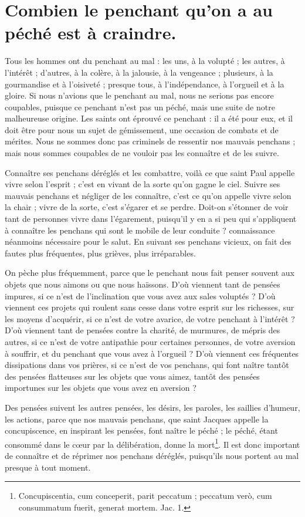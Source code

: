 \documentclass[instructions.tex]{subfiles}
\begin{document}
\chapter{Combien le penchant qu'on a au péché est à craindre.}


Tous les hommes ont du penchant au mal : les uns, à la volupté ; les autres, à l'intérêt ; d'autres, à la colère, à la jalousie, à la vengeance ; plusieurs, à la gourmandise et à l'oisiveté ; presque tous, à l'indépendance, à l'orgueil et à la gloire. Si nous n'avions que le penchant au mal, nous ne serions pas encore coupables, puisque ce penchant n'est pas un péché, mais une suite de notre malheureuse origine. Les saints ont éprouvé ce penchant : il a été pour eux, et il doit être pour nous un sujet de gémissement, une occasion de combats et de mérites. Nous ne sommes donc pas criminels de ressentir nos mauvais penchans ; mais nous sommes coupables de ne vouloir pas les connaître et de les suivre.

Connaître ses penchans déréglés et les combattre, voilà ce que saint Paul appelle vivre selon l'esprit ; c'est en vivant de la sorte qu'on gagne le ciel. Suivre ses mauvais penchans et négliger de les connaître, c'est ce qu'on appelle vivre selon la chair ; vivre de la sorte, c'est s'égarer et se perdre. Doit-on s'étonner de voir tant de personnes vivre dans l'égarement, puisqu'il y en a si peu qui s'appliquent à connaître les penchans qui sont le mobile de leur conduite ? connaissance néanmoins nécessaire pour le salut. En suivant ses penchans vicieux, on fait des fautes plus fréquentes, plus grièves, plus irréparables.


\primo On pèche plus fréquemment, parce que le penchant nous fait penser souvent aux objets que nous aimons ou que nous haïssons. D'où viennent tant de pensées impures, si ce n'est de l'inclination que vous avez aux sales voluptés ? D'où viennent ces projets qui roulent sans cesse dans votre esprit sur les richesses, sur les moyens d'acquérir, si ce n'est de votre avarice, de votre penchant à l'intérêt ? D'où viennent tant de pensées contre la charité, de murmures, de mépris des autres, si ce n'est de votre antipathie pour certaines personnes, de votre aversion à souffrir, et du penchant que vous avez à l'orgueil ? D'où viennent ces fréquentes dissipations dans vos prières, si ce n'est de vos penchans, qui font naître tantôt des pensées flatteuses sur les objets que vous aimez, tantôt des pensées importunes sur les objets que vous avez en aversion ?

Des pensées suivent les autres pensées, les désirs, les paroles, les saillies d'humeur, les actions, parce que nos mauvais penchans, que saint Jacques appelle la concupiscence, en inspirant les pensées, font naître le péché ; le péché, étant consommé dans le cœur par la délibération, donne la mort\footnote{Concupiscentia, cum conceperit, parit peccatum ; peccatum verò, cum consummatum fuerit, generat mortem. Jac. 1.}. Il est donc important de connaître et de réprimer nos penchans déréglés, puisqu'ils nous portent au mal presque à tout moment.
\end{document}
